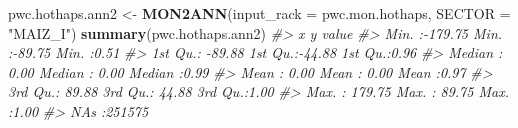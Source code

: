 \documentclass[
]{article}
\newenvironment{Shaded}{\begin{snugshade}}{\end{snugshade}}
\newcommand{\AttributeTok}[1]{\textcolor[rgb]{0.13,0.29,0.53}{#1}}
\newcommand{\CommentTok}[1]{\textcolor[rgb]{0.56,0.35,0.01}{\textit{#1}}}
\newcommand{\FunctionTok}[1]{\textcolor[rgb]{0.13,0.29,0.53}{\textbf{#1}}}
\newcommand{\NormalTok}[1]{#1}
\newcommand{\OtherTok}[1]{\textcolor[rgb]{0.56,0.35,0.01}{#1}}
\newcommand{\StringTok}[1]{\textcolor[rgb]{0.31,0.60,0.02}{#1}}
\begin{document}
\begin{Shaded}
\begin{Highlighting}[]
\NormalTok{pwc.hothaps.ann2 }\OtherTok{\textless{}{-}} \FunctionTok{MON2ANN}\NormalTok{(}\AttributeTok{input\_rack =}\NormalTok{ pwc.mon.hothaps, }\AttributeTok{SECTOR =} \StringTok{"MAIZ\_I"}\NormalTok{)}
\FunctionTok{summary}\NormalTok{(pwc.hothaps.ann2)}
\CommentTok{\#\textgreater{}        x                 y              value       }
\CommentTok{\#\textgreater{}  Min.   :{-}179.75   Min.   :{-}89.75   Min.   :0.51    }
\CommentTok{\#\textgreater{}  1st Qu.: {-}89.88   1st Qu.:{-}44.88   1st Qu.:0.96    }
\CommentTok{\#\textgreater{}  Median :   0.00   Median :  0.00   Median :0.99    }
\CommentTok{\#\textgreater{}  Mean   :   0.00   Mean   :  0.00   Mean   :0.97    }
\CommentTok{\#\textgreater{}  3rd Qu.:  89.88   3rd Qu.: 44.88   3rd Qu.:1.00    }
\CommentTok{\#\textgreater{}  Max.   : 179.75   Max.   : 89.75   Max.   :1.00    }
\CommentTok{\#\textgreater{}                                     NA\textquotesingle{}s   :251575}
\end{Highlighting}
\end{Shaded}
\end{document}
